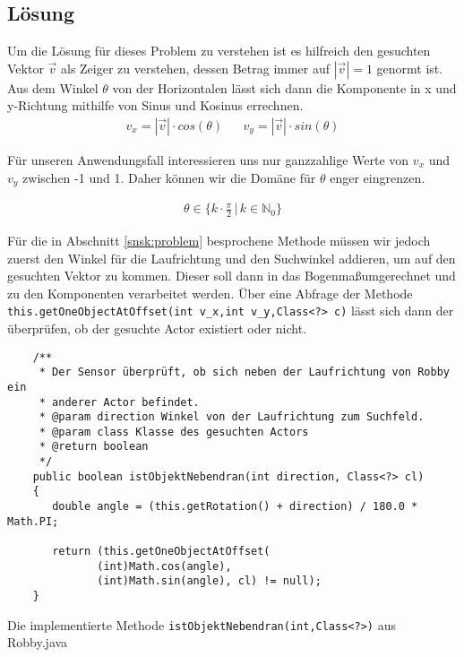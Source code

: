 \subsection{Lösung}
\label{snsk:loesung}
Um die Lösung für dieses Problem zu verstehen ist es hilfreich den gesuchten Vektor $ \vec{v} $ als Zeiger zu verstehen, dessen Betrag immer auf $ \left| \vec{v} \right| = 1 $ genormt ist. Aus dem Winkel $ \theta $ von der Horizontalen lässt sich dann die Komponente in x und y-Richtung mithilfe von Sinus und Kosinus errechnen.
\begin{align}
  v_x = \left| \vec{v} \right| \cdot cos (\theta) && v_y = \left| \vec{v} \right| \cdot sin (\theta)
\end{align}

Für unseren Anwendungsfall interessieren uns nur ganzzahlige Werte von $v_x$ und $v_y$ zwischen -1 und 1. Daher können wir die Domäne für $\theta$ enger eingrenzen.

\begin{align}
  \theta \in \Big\{ k \cdot \frac{\pi}{2} \, | \, k \in \mathbb{N}_0 \Big\}
\end{align}

Für die in Abschnitt \ref{snsk:problem} besprochene Methode müssen wir jedoch zuerst den Winkel für die Laufrichtung und den Suchwinkel addieren, um auf den gesuchten Vektor zu kommen. Dieser soll dann in das Bogenma\ss  umgerechnet und zu den Komponenten verarbeitet werden. Über eine Abfrage der Methode \texttt{this.getOneObjectAtOffset(int v_x,int v_y,Class<?> c)} lässt sich dann der überprüfen, ob der gesuchte Actor existiert oder nicht.
\begin{listing}
  \begin{verbatim}
    /**
     * Der Sensor überprüft, ob sich neben der Laufrichtung von Robby ein
     * anderer Actor befindet.
     * @param direction Winkel von der Laufrichtung zum Suchfeld.
     * @param class Klasse des gesuchten Actors
     * @return boolean
     */
    public boolean istObjektNebendran(int direction, Class<?> cl)
    {
       double angle = (this.getRotation() + direction) / 180.0 * Math.PI;

       return (this.getOneObjectAtOffset(
              (int)Math.cos(angle),
              (int)Math.sin(angle), cl) != null);
    }
  \end{verbatim}
  \caption{Die implementierte Methode \texttt{istObjektNebendran(int,Class<?>)} aus Robby.java }
\end{listing}

